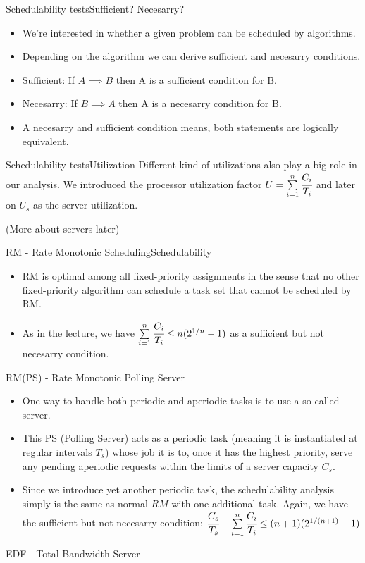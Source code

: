 \begin{frame}{Schedulability tests}{Sufficient? Necesarry?}
    \begin{itemize}
        \item We're interested in whether a given problem can be scheduled by algorithms.
        \item Depending on the algorithm we can derive sufficient and necesarry conditions.
        \item[]\alert{Sufficient:} If $A \implies B$ then A is a sufficient condition for B.
        \item[]\alert{Necesarry:} If $B \implies A$ then A is a necesarry condition for B.
        \item A necesarry and sufficient condition means, both statements are logically equivalent.
    \end{itemize}
\end{frame}
\begin{frame}{Schedulability tests}{Utilization}
    Different kind of utilizations also play a big role in our analysis. We introduced the \alert{processor utilization factor} $U = \sum\limits_{i=1}^{n}\cfrac{C_i}{T_i}$ and later on $U_s$ as the server utilization.

    (More about servers later)
\end{frame}
\begin{frame}{RM - Rate Monotonic Scheduling}{Schedulability}
\begin{itemize}
    \item RM is optimal among all fixed-priority assignments in the sense that no other fixed-priority algorithm can schedule a task set that cannot be scheduled by RM.
    \item As in the lecture, we have $\sum\limits_{i=1}^{n}\cfrac{C_i}{T_i} \leq n(2^{1/n}-1)$ as a \alert{sufficient} but not \alert{necesarry} condition.
\end{itemize}
\end{frame}
\begin{frame}{RM(PS) - Rate Monotonic Polling Server}
    \begin{itemize}
        \item One way to handle both periodic and aperiodic tasks is to use a so called server.
        \item This PS (Polling Server) acts as a periodic task (meaning it is instantiated at regular intervals $T_s$) whose job it is to, once it has the highest priority, serve any pending aperiodic requests within the limits of a server capacity $C_s$.
        \item Since we introduce yet another periodic task, the schedulability analysis simply is the same as normal $RM$ with one additional task. Again, we have the \alert{sufficient} but not \alert{necesarry} condition: $\cfrac{C_s}{T_s} + \sum\limits_{i=1}^{n}\cfrac{C_i}{T_i} \leq (n+1)(2^{1/(n+1)}-1)$
    \end{itemize}
\end{frame}

\begin{frame}{EDF - Total Bandwidth Server}

\end{frame}
